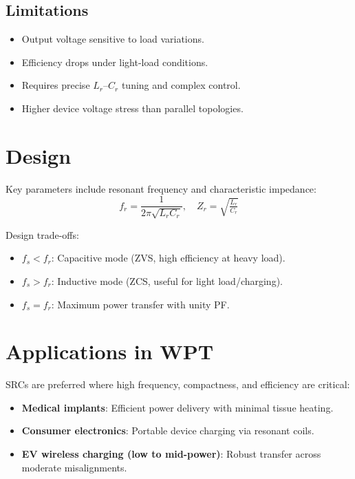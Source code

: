 \documentclass[12pt,a4paper]{report}
\begin{document}
\subsection*{Limitations}
\begin{itemize}
    \item Output voltage sensitive to load variations.
    \item Efficiency drops under light-load conditions.
    \item Requires precise \(L_r\)–\(C_r\) tuning and complex control.
    \item Higher device voltage stress than parallel topologies.\cite{irivennela2020wireless}\cite{li2022singleended}\cite{lin2021analysis}\cite{erickson2020resonant}
\end{itemize}

\section{Design }
Key parameters include resonant frequency and characteristic impedance:
\[
f_r = \frac{1}{2\pi \sqrt{L_r C_r}}, \quad Z_r = \sqrt{\tfrac{L_r}{C_r}}
\]

Design trade-offs:
\begin{itemize}
    \item \(f_s < f_r\): Capacitive mode (ZVS, high efficiency at heavy load).
    \item \(f_s > f_r\): Inductive mode (ZCS, useful for light load/charging).
    \item \(f_s = f_r\): Maximum power transfer with unity PF.
    \cite{bertolini2021frequency}
\end{itemize}

\section{Applications in WPT}
SRCs are preferred where high frequency, compactness, and efficiency are critical:
\begin{itemize}
    \item \textbf{Medical implants}: Efficient power delivery with minimal tissue heating.
    \item \textbf{Consumer electronics}: Portable device charging via resonant coils.
    \item \textbf{EV wireless charging (low to mid-power)}: Robust transfer across moderate misalignments.
    \cite{choi2020resonant}
\end{itemize}
\end{document}
